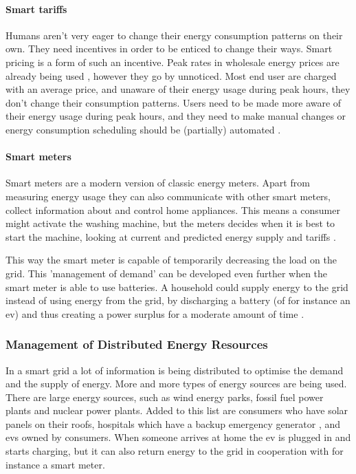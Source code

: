 \paragraph{Smart tariffs}
Humans aren’t very eager to change their energy consumption patterns on their own. They need incentives in order to be enticed to change their ways. Smart pricing is a form of such an incentive. Peak rates in wholesale energy prices are already being used \cite{SamadiMohsenian-RadSchoberEtAl2012}, however they go by unnoticed. Most end user are charged with an average price, and unaware of their energy usage during peak hours, they don’t change their consumption patterns. Users need to be made more aware of their energy usage during peak hours, and they need to make manual changes \cite{Mohsenian-RadLeon-Garcia2010} or energy consumption scheduling should be (partially) automated \cite{SamadiMohsenian-RadSchoberEtAl2012}.

\paragraph{Smart meters}
Smart meters are a modern version of classic energy meters. Apart from measuring energy usage they can also communicate with other smart meters, collect information about and control home appliances. This means a consumer might activate the washing machine, but the meters decides when it is best to start the machine, looking at current and predicted energy supply and tariffs  \cite{DepuruWangDevabhaktuni2011a}. 

This way the smart meter is capable of temporarily decreasing the load on the grid. This 'management of demand' can be developed even further when the smart meter is able to use batteries. A household could supply energy to the grid instead of using energy from the grid, by discharging a battery (of for instance an \gls{ev}) and thus creating a power surplus for a moderate amount of time \cite{MwasiluJustoKimEtAl2014}. 

\subsubsection{Management of Distributed Energy Resources}
In a smart grid a lot of information is being distributed to optimise the demand and the supply of energy. More and more types of energy sources are being used. There are large energy sources, such as wind energy parks, fossil fuel power plants and nuclear power plants. Added to this list are consumers who have solar panels on their roofs, hospitals which have a backup emergency generator \cite{Kumagai2012}, and \glspl{ev} owned by consumers. When someone arrives at home the \gls{ev} is plugged in and starts charging, but it can also return energy to the grid in cooperation with for instance a smart meter.

